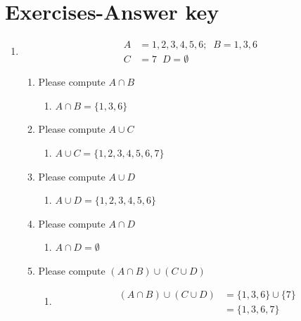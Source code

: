 \documentclass[krantz1,ChapterTOCs]{krantz}
\begin{document}
\section{Exercises-Answer key}

\begin{enumerate}
    \item \begin{align*}
              A &= {1,2,3,4,5,6};
              \;\;B = {1,3,6} \\
              C &= {7}  
              \;\;D = \emptyset
           \end{align*}
    \begin{enumerate}
        \item Please compute $A \cap B$
        \begin{enumerate}
            \item {\color{red} $A \cap B = \{1,3,6  \}$ }
        \end{enumerate}
        \item Please compute $A \cup C$
            \begin{enumerate}
                \item {\color{red} $A \cup C =  \{1,2,3,4,5,6,7\}$}
            \end{enumerate}
        
        \item Please compute $A \cup D$
            \begin{enumerate}
                \item {\color{red} $A \cup D = \{1,2,3,4,5,6\}$  }
            \end{enumerate}
        
        \item Please compute $A \cap D$
            \begin{enumerate}
                \item {\color{red} $A \cap D = \emptyset$  }
            \end{enumerate}
        
        \item Please compute $(A \cap B) \cup (C \cup D)$
            \begin{enumerate}
                \item {\color{red}
                \begin{align*}
                    (A \cap B) \cup (C \cup D) &= \{1,3,6\} \cup \{7\} \\
                    &= \{1,3,6,7\}
                \end{align*}    
                    }
            \end{enumerate}
        

\end{enumerate}
\end{enumerate}
\end{document}
